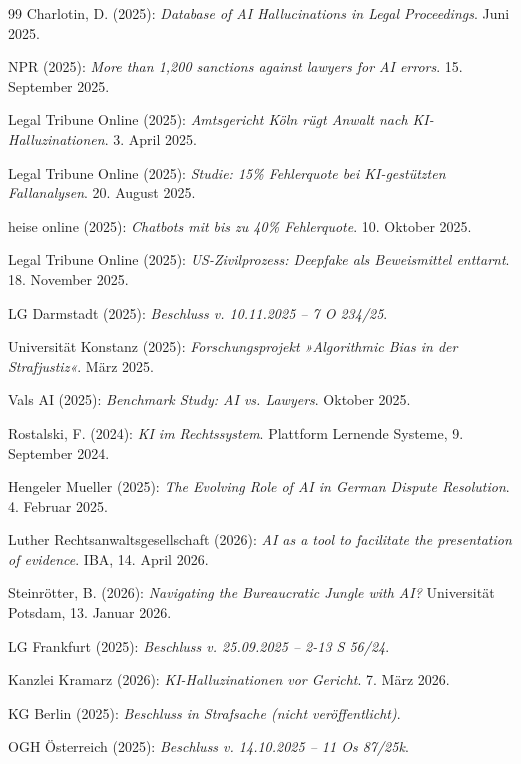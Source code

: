 \documentclass[12pt,a4paper]{article}
\begin{document}
\begin{thebibliography}{99}
		 Charlotin, D. (2025): \emph{Database of AI Hallucinations in Legal Proceedings}. Juni 2025.
		
		 NPR (2025): \emph{More than 1,200 sanctions against lawyers for AI errors}. 15. September 2025.
		
		 Legal Tribune Online (2025): \emph{Amtsgericht Köln rügt Anwalt nach KI-Halluzinationen}. 3. April 2025.
		
		 Legal Tribune Online (2025): \emph{Studie: 15\% Fehlerquote bei KI-gestützten Fallanalysen}. 20. August 2025.
		
		 heise online (2025): \emph{Chatbots mit bis zu 40\% Fehlerquote}. 10. Oktober 2025.
		
		 Legal Tribune Online (2025): \emph{US-Zivilprozess: Deepfake als Beweismittel enttarnt}. 18. November 2025.
		
		 LG Darmstadt (2025): \emph{Beschluss v. 10.11.2025 – 7 O 234/25}.
		
		 Universität Konstanz (2025): \emph{Forschungsprojekt »Algorithmic Bias in der Strafjustiz«}. März 2025.
		
		 Vals AI (2025): \emph{Benchmark Study: AI vs. Lawyers}. Oktober 2025.
		
		 Rostalski, F. (2024): \emph{KI im Rechtssystem}. Plattform Lernende Systeme, 9. September 2024.
		
		 Hengeler Mueller (2025): \emph{The Evolving Role of AI in German Dispute Resolution}. 4. Februar 2025.
		
		 Luther Rechtsanwaltsgesellschaft (2026): \emph{AI as a tool to facilitate the presentation of evidence}. IBA, 14. April 2026.
		
		 Steinrötter, B. (2026): \emph{Navigating the Bureaucratic Jungle with AI?} Universität Potsdam, 13. Januar 2026.
		
		 LG Frankfurt (2025): \emph{Beschluss v. 25.09.2025 – 2-13 S 56/24}.
		
		 Kanzlei Kramarz (2026): \emph{KI-Halluzinationen vor Gericht}. 7. März 2026.
		
		 KG Berlin (2025): \emph{Beschluss in Strafsache (nicht veröffentlicht)}.
		
		 OGH Österreich (2025): \emph{Beschluss v. 14.10.2025 – 11 Os 87/25k}.
		

\end{thebibliography}
\end{document}
